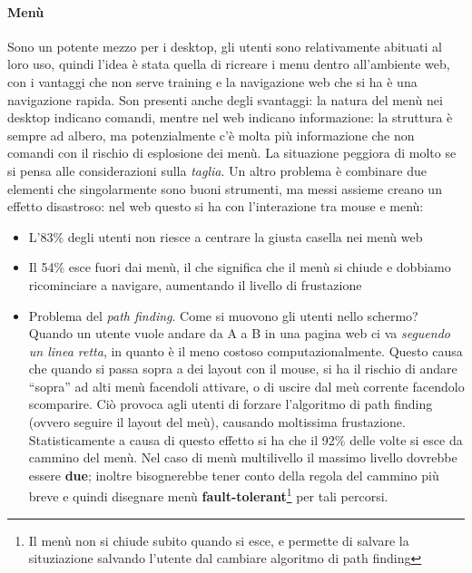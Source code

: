 \paragraph*{Men\`u} Sono un potente mezzo per i desktop, gli utenti sono relativamente abituati al loro uso, quindi l'idea \`e stata quella di ricreare i menu dentro all'ambiente web, con i vantaggi che non serve training e la navigazione web che si ha \`e una navigazione rapida. Son presenti anche degli svantaggi: la natura del men\`u nei desktop indicano comandi, mentre nel web indicano informazione: la struttura \`e sempre ad albero, ma potenzialmente c'\`e molta pi\`u informazione che non comandi con il rischio di esplosione dei men\`u. La situazione peggiora di molto se si pensa alle considerazioni sulla \textit{taglia}. Un altro problema \`e combinare due elementi che singolarmente sono buoni strumenti, ma messi assieme creano un effetto disastroso: nel web questo si ha con l'interazione tra mouse e men\`u:
\begin{itemize}

\item L'83\% degli utenti non riesce a centrare la giusta casella nei men\`u web

\item Il 54\% esce fuori dai men\`u, il che significa che il men\`u si chiude e dobbiamo ricominciare a navigare, aumentando il livello di frustazione

\item Problema del \textit{path finding}. Come si muovono gli utenti nello schermo? Quando un utente vuole andare da A a B in una pagina web ci va \textit{seguendo un linea retta}, in quanto \`e il meno costoso computazionalmente. Questo causa che quando si passa sopra a dei layout con il mouse, si ha il rischio di andare ``sopra'' ad alti men\`u facendoli attivare, o di uscire dal me\`u corrente facendolo scomparire. Ci\`o provoca agli utenti di forzare l'algoritmo di path finding (ovvero seguire il layout del me\`u), causando moltissima frustazione. Statisticamente a causa di questo effetto si ha che il 92\% delle volte si esce da cammino del men\`u. Nel caso di men\`u multilivello il massimo livello dovrebbe essere \textbf{due}; inoltre bisognerebbe tener conto della regola del cammino pi\`u breve e quindi disegnare men\`u \textbf{fault-tolerant}\footnote{Il men\`u non si chiude subito quando si esce, e permette di salvare la situziazione salvando l'utente dal cambiare algoritmo di path finding} per tali percorsi.

\end{itemize}

